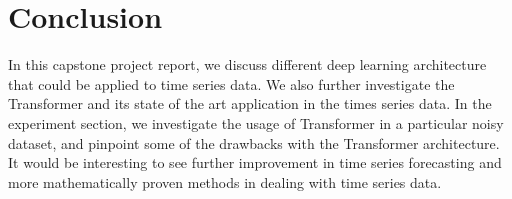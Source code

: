 \documentclass{article} %
\begin{document}



\section{Conclusion}

In this capstone project report, we discuss different deep learning architecture that could be applied to time series data.
We also further investigate the Transformer and its state of the art application in the times series data.
In the experiment section, we investigate the usage of Transformer in a particular noisy dataset, and pinpoint some of the drawbacks with the Transformer architecture.
It would be interesting to see further improvement in time series forecasting and more mathematically proven methods in dealing with time series data.



\end{document}
